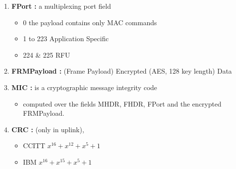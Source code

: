 \begin{landscape}
\begin{multicols}{2}
\begin{enumerate}
	\item \textbf{FPort :}  a multiplexing port field
	\begin{itemize}
		\item 0  the payload contains only MAC commands
		 \item 1 to 223  Application Specific
		 \item 224 \& 225  RFU
	\end{itemize}
    \item \textbf{FRMPayload :} (Frame Payload)  Encrypted (AES, 128 key length) Data                                 
	\item \textbf{MIC :}  is a cryptographic message integrity code
	\begin{itemize}
		\item computed over the fields MHDR, FHDR, FPort and the encrypted FRMPayload.
	\end{itemize}
	\item \textbf{CRC :} (only in uplink), 
	\begin{itemize}
		\item CCITT  $x^{16} + x^{12} + x^{5} + 1$
		\item IBM  $x^{16} + x^{15} + x^{5} + 1$
	\end{itemize}
\end{enumerate}

\end{multicols}


\end{landscape}


